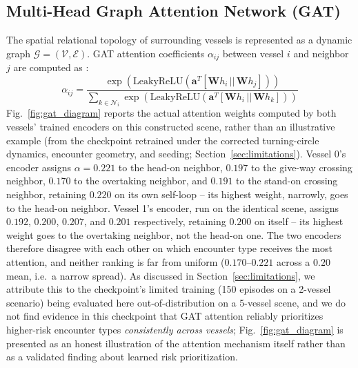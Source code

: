 \documentclass[journal,twocolumn,10pt]{IEEEtran}
\begin{document}
\subsection{Multi-Head Graph Attention Network (GAT)}
The spatial relational topology of surrounding vessels is represented as a dynamic graph $\mathcal{G} = (\mathcal{V}, \mathcal{E})$. GAT attention coefficients $\alpha_{ij}$ between vessel $i$ and neighbor $j$ are computed as \cite{velickovic2018graph, li2025gat_maritime}:
\begin{equation}
\alpha_{ij} = \frac{\exp\left(\text{LeakyReLU}\left(\mathbf{a}^T [\mathbf{W}h_i \,||\, \mathbf{W}h_j]\right)\right)}{\sum_{k \in \mathcal{N}_i} \exp\left(\text{LeakyReLU}\left(\mathbf{a}^T [\mathbf{W}h_i \,||\, \mathbf{W}h_k]\right)\right)}
\end{equation}
Fig.~\ref{fig:gat_diagram} reports the actual attention weights computed by both vessels' trained encoders on this constructed scene, rather than an illustrative example (from the checkpoint retrained under the corrected turning-circle dynamics, encounter geometry, and seeding; Section~\ref{sec:limitations}). Vessel 0's encoder assigns $\alpha = 0.221$ to the head-on neighbor, $0.197$ to the give-way crossing neighbor, $0.170$ to the overtaking neighbor, and $0.191$ to the stand-on crossing neighbor, retaining $0.220$ on its own self-loop -- its highest weight, narrowly, goes to the head-on neighbor. Vessel 1's encoder, run on the identical scene, assigns $0.192$, $0.200$, $0.207$, and $0.201$ respectively, retaining $0.200$ on itself -- its highest weight goes to the overtaking neighbor, not the head-on one. The two encoders therefore disagree with each other on which encounter type receives the most attention, and neither ranking is far from uniform ($0.170$--$0.221$ across a $0.20$ mean, i.e.\ a narrow spread). As discussed in Section~\ref{sec:limitations}, we attribute this to the checkpoint's limited training (150 episodes on a 2-vessel scenario) being evaluated here out-of-distribution on a 5-vessel scene, and we do not find evidence in this checkpoint that GAT attention reliably prioritizes higher-risk encounter types \emph{consistently across vessels}; Fig.~\ref{fig:gat_diagram} is presented as an honest illustration of the attention mechanism itself rather than as a validated finding about learned risk prioritization.
\end{document}
